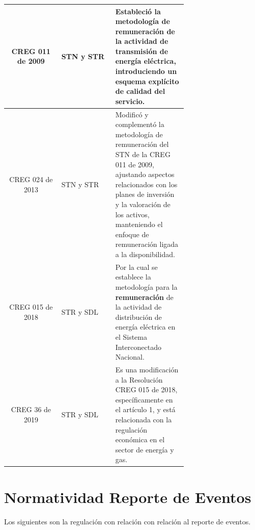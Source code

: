 \documentclass[a5paper]{book}%
\begin{document}
\begin{longtable}{|c|p{0.3\linewidth}|p{0.4\linewidth}|}
  CREG 011 de 2009 &  \ac{STN} y \ac{STR} & Estableció la metodología de remuneración de la actividad de transmisión de energía eléctrica, introduciendo un esquema explícito de calidad del servicio.\\\hline

  CREG 024 de 2013 &  \ac{STN} y \ac{STR}  & Modificó y complementó la metodología de remuneración del STN de la CREG 011 de 2009, ajustando aspectos relacionados con los planes de inversión y la valoración de los activos, manteniendo el enfoque de remuneración ligada a la disponibilidad.\\\hline

  CREG 015 de 2018& \ac{STR}  y \ac{SDL} &Por la cual se establece la metodología para la \textbf{remuneración} de la actividad de
distribución de energía eléctrica en el Sistema Interconectado
                                           Nacional.\\\hline

  CREG 36 de 2019 & \ac{STR}  y \ac{SDL}  & Es una modificación a la Resolución CREG 015 de 2018, específicamente en el artículo 1, y está relacionada con la regulación económica en el sector de energía y gas.\\\hline

   
\end{longtable}


\section{Normatividad Reporte de Eventos}

Los siguientes son la regulación con relación con relación al reporte de eventos.
\end{document}
